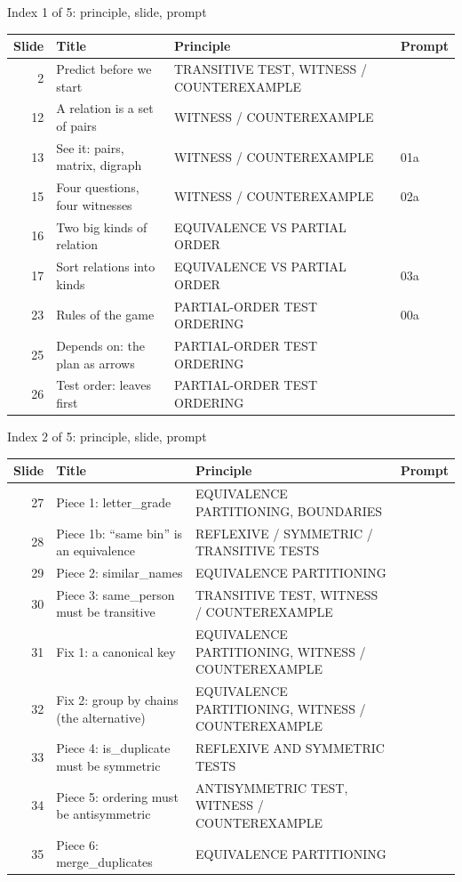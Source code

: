 \begin{frame}{Index 1 of 5: principle, slide, prompt}
\scriptsize
\begin{tabular}{@{}r>{\raggedright\arraybackslash}p{5.4cm}>{\raggedright\arraybackslash}p{4.6cm}p{1.2cm}@{}}
\textbf{Slide} & \textbf{Title} & \textbf{Principle} & \textbf{Prompt}\\\midrule
2 & Predict before we start & TRANSITIVE TEST, WITNESS / COUNTEREXAMPLE & \\
12 & A relation is a set of pairs & WITNESS / COUNTEREXAMPLE & \\
13 & See it: pairs, matrix, digraph & WITNESS / COUNTEREXAMPLE & 01a\\
15 & Four questions, four witnesses & WITNESS / COUNTEREXAMPLE & 02a\\
16 & Two big kinds of relation & EQUIVALENCE VS PARTIAL ORDER & \\
17 & Sort relations into kinds & EQUIVALENCE VS PARTIAL ORDER & 03a\\
23 & Rules of the game & PARTIAL-ORDER TEST ORDERING & 00a\\
25 & Depends on: the plan as arrows & PARTIAL-ORDER TEST ORDERING & \\
26 & Test order: leaves first & PARTIAL-ORDER TEST ORDERING & \\
\end{tabular}
\end{frame}
\begin{frame}{Index 2 of 5: principle, slide, prompt}
\scriptsize
\begin{tabular}{@{}r>{\raggedright\arraybackslash}p{5.4cm}>{\raggedright\arraybackslash}p{4.6cm}p{1.2cm}@{}}
\textbf{Slide} & \textbf{Title} & \textbf{Principle} & \textbf{Prompt}\\\midrule
27 & Piece 1: letter\_grade & EQUIVALENCE PARTITIONING, BOUNDARIES & \\
28 & Piece 1b: ``same bin'' is an equivalence & REFLEXIVE / SYMMETRIC / TRANSITIVE TESTS & \\
29 & Piece 2: similar\_names & EQUIVALENCE PARTITIONING & \\
30 & Piece 3: same\_person must be transitive & TRANSITIVE TEST, WITNESS / COUNTEREXAMPLE & \\
31 & Fix 1: a canonical key & EQUIVALENCE PARTITIONING, WITNESS / COUNTEREXAMPLE & \\
32 & Fix 2: group by chains (the alternative) & EQUIVALENCE PARTITIONING, WITNESS / COUNTEREXAMPLE & \\
33 & Piece 4: is\_duplicate must be symmetric & REFLEXIVE AND SYMMETRIC TESTS & \\
34 & Piece 5: ordering must be antisymmetric & ANTISYMMETRIC TEST, WITNESS / COUNTEREXAMPLE & \\
35 & Piece 6: merge\_duplicates & EQUIVALENCE PARTITIONING & \\
\end{tabular}
\end{frame}
